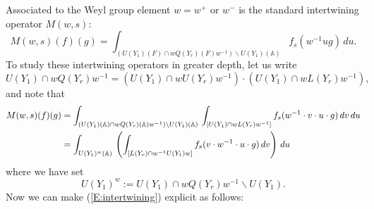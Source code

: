 \documentclass[10pt]{amsart}
\theoremstyle{plain}
\numberwithin{equation}{section}
\begin{document}
Associated to the Weyl group element $w=w^+$ or $w^-$ is the standard
intertwining operator $M(w,s)$:
\[  M(w, s)(f)(g) = \int_{(U(Y_1)(F)  \cap w Q(Y_r)(F) w^{-1})\backslash U(Y_1)({\mathbb{A}})}
f_s(w^{-1} u  g) \, du.\]
To study these intertwining operators in greater depth, let us write
\[  
U(Y_1)  \cap w Q(Y_r) w^{-1}
=  (U(Y_1) \cap wU(Y_r) w^{-1}) \cdot (U(Y_1) \cap w L(Y_r) w^{-1}),  
\]
and note that
\begin{align}\label{E:intertwining}
  M(w, s)(f)(g)
&=  \int_{ (U(Y_1)({\mathbb{A}})  \cap w Q(Y_r)({\mathbb{A}}) w^{-1})\backslash
  U(Y_1)({\mathbb{A}})} \, 
\int_{[U(Y_1) \cap w L(Y_r)  w^{-1}]}  f_s( w^{-1} \cdot v\cdot u \cdot g) \, dv \, du \notag \\
&=  \int_{ U(Y_1)^w({\mathbb{A}})} 
\, \left(   \int_{[L(Y_r) \cap w^{-1} U(Y_1)  w]} f_s( v \cdot w^{-1} \cdot u \cdot g) \, dv  \right) \, du 
\end{align}
where we have set
\[  U(Y_1)^w :=  U(Y_1) \cap wQ(Y_r) w^{-1} \backslash U(Y_1). \]
Now we can make (\ref{E:intertwining}) explicit as follows:
\end{document}
